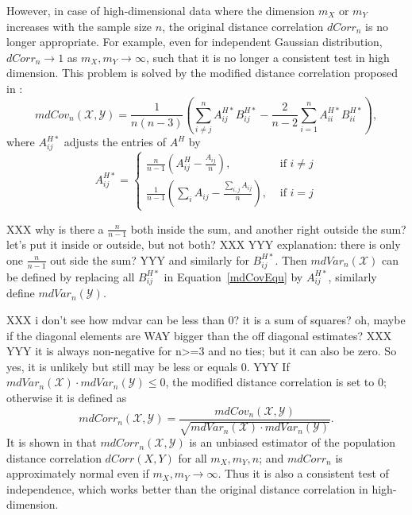 \documentclass[11pt]{article}
\begin{document}
However, in case of high-dimensional data where the dimension $m_{X}$ or $m_{Y}$ increases with the sample size $n$, the original distance correlation $dCorr_{n}$ is no longer appropriate. For example, even for independent Gaussian distribution, $dCorr_{n} \rightarrow 1$ as $m_{X}, m_{Y} \rightarrow \infty$, such that it is no longer a consistent test in high dimension. This problem is solved by the modified distance correlation proposed in \cite{SzekelyRizzo2013a}:
\begin{equation}
\label{mdCovEqu}
mdCov_{n}(\mathcal{X},\mathcal{Y})=\frac{1}{n(n-3)}(\sum_{i \neq j}^{n}A^{H*}_{ij}B^{H*}_{ij}-\frac{2}{n-2}\sum_{i=1}^{n}A^{H*}_{ii}B^{H*}_{ii}),
\end{equation}
where $A^{H*}_{ij}$ adjusts the entries of $A^{H}$ by
\[A^{H*}_{ij} = \left\{
  \begin{array}{lr}
    \frac{n}{n-1}(A^{H}_{ij}-\frac{A_{ij}}{n}), & \mbox{ if } i \neq j \\
    \frac{1}{n-1}(\sum_{i}A_{ij}-\frac{\sum_{i,j}A_{ij}}{n}), &\mbox{ if } i = j
  \end{array}
\right.
\] 

XXX why is there a $\frac{n}{n-1}$ both inside the sum, and another right outside the sum? let's put it inside or outside, but not both? XXX 
YYY explanation: there is only one $\frac{n}{n-1}$ out side the sum? YYY
and similarly for $B^{H*}_{ij}$. Then $mdVar_{n}(\mathcal{X})$ can be defined by replacing all $B^{H*}_{ij}$ in Equation~\ref{mdCovEqu} by $A^{H*}_{ij}$, similarly define $mdVar_{n}(\mathcal{Y})$. 

XXX i don't see how mdvar can be less than 0? it is a sum of squares? oh, maybe if the diagonal elements are WAY bigger than the off diagonal estimates? XXX
YYY it is always non-negative for n>=3 and no ties; but it can also be zero. So yes, it is unlikely but still may be less or equals 0. YYY
If $mdVar_{n}(\mathcal{X}) \cdot mdVar_{n}(\mathcal{Y}) \leq 0$, the modified distance correlation is set to $0$; otherwise it is defined as
\begin{equation}
\label{mdCorrEqu}
mdCorr_{n}(\mathcal{X},\mathcal{Y})=\frac{mdCov_{n}(\mathcal{X},\mathcal{Y})}{\sqrt{mdVar_{n}(\mathcal{X}) \cdot mdVar_{n}(\mathcal{Y})}}.
\end{equation}
It is shown in \cite{SzekelyRizzo2013a} that $mdCorr_{n}(\mathcal{X},\mathcal{Y})$ is an unbiased estimator of the population distance correlation $dCorr(X,Y)$ for all $m_{X}, m_{Y}, n$; and $mdCorr_{n}$ is approximately normal even if $m_{X},m_{Y} \rightarrow \infty$. Thus it is also a consistent test of independence, which works better than the original distance correlation in high-dimension.
\end{document}
